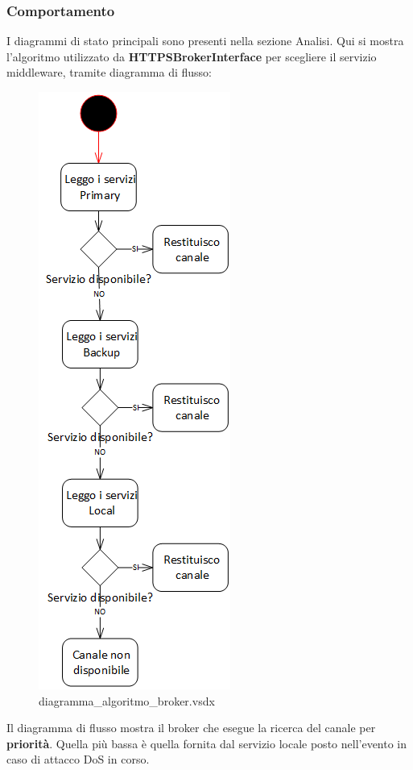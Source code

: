 \documentclass[a4paper]{article}
\begin{document}
\newpage

\subsubsection{Comportamento}

I diagrammi di stato principali sono presenti nella sezione Analisi. Qui si mostra l'algoritmo utilizzato da \textbf{HTTPSBrokerInterface} per scegliere il servizio middleware, tramite diagramma di flusso:

\begin{figure}[H]
    \includegraphics[scale=1]{Progettazione/Comportamento/diagramma_algoritmo_broker.png}
    \centering
    \caption{diagramma\_algoritmo\_broker.vsdx}
\end{figure}

Il diagramma di flusso mostra il broker che esegue la ricerca del canale per \textbf{priorità}. Quella più bassa è quella fornita dal servizio locale posto nell'evento in caso di attacco DoS in corso.
\end{document}
